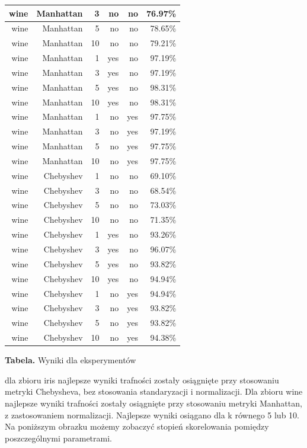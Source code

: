 \documentclass{classrep}
\begin{document}
\begin{center}
\begin{longtable}{|r|r|r|r|r|r|}
	\hline
		wine & Manhattan & 3 & no & no & 76.97\% \\
	\hline
		wine & Manhattan & 5 & no & no & 78.65\% \\
	\hline
		wine & Manhattan & 10 & no & no & 79.21\% \\
	\hline
		wine & Manhattan & 1 & yes & no & 97.19\% \\
	\hline
		wine & Manhattan & 3 & yes & no & 97.19\% \\
	\hline
		wine & Manhattan & 5 & yes & no & 98.31\% \\
	\hline
		wine & Manhattan & 10 & yes & no & 98.31\% \\
	\hline
		wine & Manhattan & 1 & no & yes & 97.75\% \\
	\hline
		wine & Manhattan & 3 & no & yes & 97.19\% \\
	\hline
		wine & Manhattan & 5 & no & yes & 97.75\% \\
	\hline
		wine & Manhattan & 10 & no & yes & 97.75\% \\
	\hline
		wine & Chebyshev & 1 & no & no & 69.10\% \\
	\hline
		wine & Chebyshev & 3 & no & no & 68.54\% \\
	\hline
		wine & Chebyshev & 5 & no & no & 73.03\% \\
	\hline
		wine & Chebyshev & 10 & no & no & 71.35\% \\
	\hline
		wine & Chebyshev & 1 & yes & no & 93.26\% \\
	\hline
		wine & Chebyshev & 3 & yes & no & 96.07\% \\
	\hline
		wine & Chebyshev & 5 & yes & no & 93.82\% \\
	\hline
		wine & Chebyshev & 10 & yes & no & 94.94\% \\
	\hline
		wine & Chebyshev & 1 & no & yes & 94.94\% \\
	\hline
		wine & Chebyshev & 3 & no & yes & 93.82\% \\
	\hline
		wine & Chebyshev & 5 & no & yes & 93.82\% \\
	\hline
		wine & Chebyshev & 10 & no & yes & 94.38\% \\


  \hline
\end{longtable} 
\textbf{Tabela.} Wyniki dla eksperymentów
\end{center}

dla zbioru iris najlepsze wyniki trafności zostały osiągnięte przy stosowaniu metryki Chebysheva, bez stosowania standaryzacji i normalizacji. Dla zbioru wine najlepsze wyniki trafności zostały osiągnięte przy stosowaniu metryki Manhattan, z zastosowaniem normalizacji. Najlepsze wyniki osiągano dla k równego 5 lub 10. Na poniższym obrazku możemy zobaczyć stopień skorelowania pomiędzy poszczególnymi parametrami.
\end{document}
